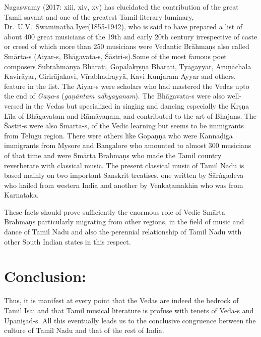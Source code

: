 Nagaswamy (2017: xiii, xiv, xv) has elucidated the contribution of the great Tamil savant and one of the greatest Tamil literary luminary, Dr.\ U.V.\ Swāminātha Iyer(1855-1942), who is said to have prepared a list of about 400 great musicians of the 19th and early 20th century irrespective of caste or creed of which more than 250 musicians were Vedantic Brāhmaṇs also called Smārta-s (Aiyar-s, Bhāgavata-s, Śāstri-s).Some of the most famous poet composers Subrahmanya Bhārati, Gopālakṛṣṇa Bhārati, Tyāgayyar, Aruṇāchala Kavirāyar, Girirājakavi, Vīrabhadrayyā, Kavi Kunjaram Ayyar and others, feature in the list. The Aiyar-s were scholars who had mastered the Vedas upto the end of \textit{Gaṇa}-s (\textit{gaṇāntam adhyayanam}). The Bhāgavata-s were also well-versed in the Vedas but specialized in singing and dancing especially the Kṛṣṇa Līla of Bhāgavatam and Rāmāyaṇam, and contributed to the art of Bhajans. The Śāstri-s were also Smārta-s, of the Vedic learning but seems to be immigrants from Telugu region. There were others like Gopaṇṇa who were Kannaḍiga immigrants from Mysore and Bangalore who amounted to almost 300 musicians of that time and were Smārta Brahmaṇs who made the Tamil country reverberate with classical music. The present classical music of Tamil Nadu is based mainly on two important Sanskrit treatises, one written by Śārṅgadeva who hailed from western India and another by Venkaṭamakhin who was from Karnataka.

These facts should prove sufficiently the enormous role of Vedic Smārta Brāhmaṇs particularly migrating from other regions, in the field of music and dance of Tamil Nadu and also the perennial relationship of Tamil Nadu with other South Indian states in this respect.


\section*{Conclusion:}

Thus, it is manifest at every point that the Vedas are indeed the bedrock of Tamil Isai and that Tamil musical literature is profuse with tenets of Veda-s and Upanişad-s. All this eventually leads us to the conclusive congruence between the culture of Tamil Nadu and that of the rest of India.

